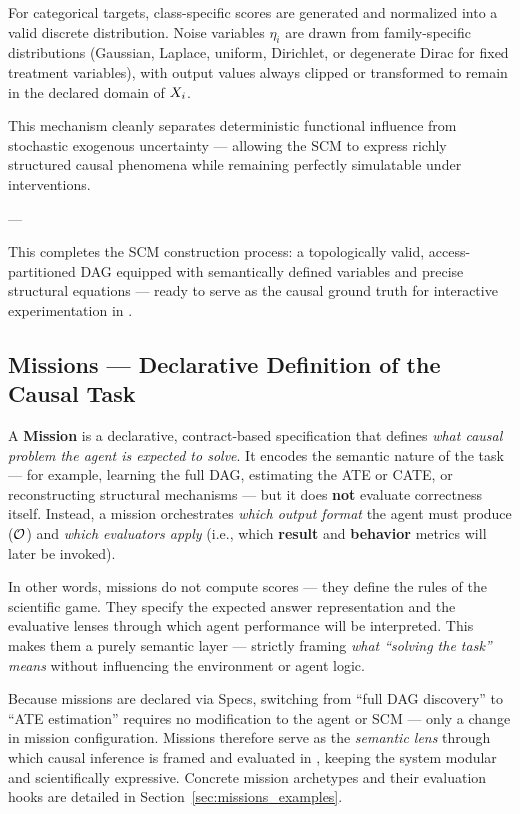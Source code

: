 For categorical targets, class-specific scores are generated and normalized into a valid discrete distribution.  
Noise variables $\eta_i$ are drawn from family-specific distributions (Gaussian, Laplace, uniform, Dirichlet, or degenerate Dirac for fixed treatment variables), with output values always clipped or transformed to remain in the declared domain of $X_i$.

This mechanism cleanly separates deterministic functional influence from stochastic exogenous uncertainty — allowing the SCM to express richly structured causal phenomena while remaining perfectly simulatable under interventions.

---

This completes the SCM construction process: a topologically valid, access-partitioned DAG equipped with semantically defined variables and precise structural equations — ready to serve as the causal ground truth for interactive experimentation in \game.

\subsection{Missions — Declarative Definition of the Causal Task}

A \textbf{Mission} is a declarative, contract-based specification that defines \emph{what causal problem the agent is expected to solve}. It encodes the semantic nature of the task — for example, learning the full DAG, estimating the ATE or CATE, or reconstructing structural mechanisms — but it does \textbf{not} evaluate correctness itself. Instead, a mission orchestrates \emph{which output format} the agent must produce ($\outputspace$) and \emph{which evaluators apply} (i.e., which \textbf{result} and \textbf{behavior} metrics will later be invoked).

In other words, missions do not compute scores — they define the rules of the scientific game. They specify the expected answer representation and the evaluative lenses through which agent performance will be interpreted. This makes them a purely semantic layer — strictly framing \emph{what “solving the task” means} without influencing the environment or agent logic.

Because missions are declared via Specs, switching from “full DAG discovery” to “ATE estimation” requires no modification to the agent or SCM — only a change in mission configuration. Missions therefore serve as the \emph{semantic lens} through which causal inference is framed and evaluated in \game, keeping the system modular and scientifically expressive.
Concrete mission archetypes and their evaluation hooks are detailed in Section~\ref{sec:missions_examples}.


